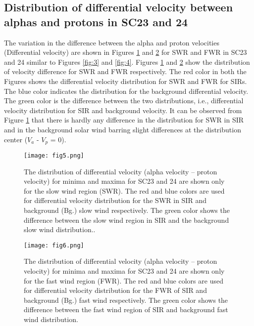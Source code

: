 \documentclass[letters,usenatbib]{mnras}
\begin{document}
\subsection{Distribution of differential velocity between alphas and protons in SC23 and 24 }

The variation in the difference between the alpha and proton velocities (Differential velocity) are shown in Figures \ref{fig:5} and \ref{fig:6} for SWR and FWR in SC23 and 24 similar to Figures \ref{fig:3} and \ref{fig:4}. Figures \ref{fig:5} and \ref{fig:6} show the distribution of velocity difference for SWR and FWR respectively. The red color in both the Figures shows the differential velocity distribution for SWR and FWR for SIRs. The blue color indicates the distribution for the background differential velocity. The green color is the difference between the two distributions, i.e., differential velocity distribution for SIR and background velocity. It can be observed from Figure \ref{fig:5} that there is hardly any difference in the distribution for SWR in SIR and in the background solar wind barring slight differences at the distribution center ($V_a$ - $V_p$ = 0). 

\begin{figure}
\begin{center}
\texttt{[image: fig5.png]}
\caption{The distribution of differential velocity (alpha velocity – proton velocity) for minima and maxima for SC23 and 24 are shown only for the slow wind region (SWR). The red and blue colors are used for differential velocity distribution for the SWR in SIR and background (Bg.) slow wind respectively. The green color shows the difference between the slow wind region in SIR and the background slow wind distribution..      \label{fig:5}}

\end{center}
\end{figure}

\begin{figure}
\begin{center}
\texttt{[image: fig6.png]}
\caption{The distribution of differential velocity (alpha velocity – proton velocity) for minima and maxima for SC23 and 24 are shown only for the fast wind region (FWR). The red and blue colors are used for differential velocity distribution for the FWR of SIR and background (Bg.) fast wind respectively. The green color shows the difference between the fast wind region of SIR and background fast wind distribution.      \label{fig:6}}

\end{center}
\end{figure}
\end{document}
